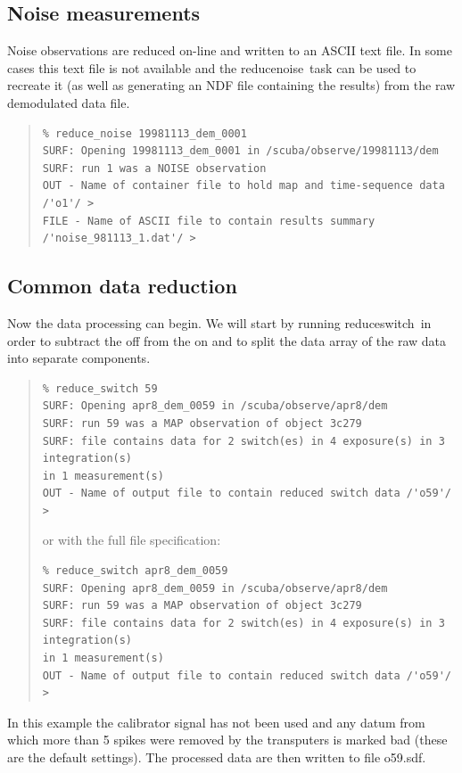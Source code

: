 \documentclass[twoside,11pt]{article}
\newcommand{\task}[1]{{\sf #1}}
\newcommand{\renoise}{\htmlref{\task{reduce\_noise}}{REDUCE_NOISE}}
\newcommand{\resw}{\htmlref{\task{reduce\_switch}}{REDUCE_SWITCH}}
\newenvironment{myquote}{\begin{quote}\begin{small}}{\end{small}\end{quote}}
\newcommand{\htmlref}[2]{#1}
\renewcommand{\_}{\texttt{\symbol{95}}}
\begin{document}
\subsection{Noise measurements}

Noise observations are reduced on-line and written to an ASCII text file.
In some cases this text file is not available and the \renoise\ task
can be used to recreate it (as well as generating an NDF file containing
the results) from the raw demodulated data file.

\begin{myquote}
\begin{verbatim}
% reduce_noise 19981113_dem_0001
SURF: Opening 19981113_dem_0001 in /scuba/observe/19981113/dem
SURF: run 1 was a NOISE observation
OUT - Name of container file to hold map and time-sequence data /'o1'/ > 
FILE - Name of ASCII file to contain results summary /'noise_981113_1.dat'/ > 
\end{verbatim}
\end{myquote}

\subsection{Common data reduction}

Now the data processing can begin. We will start by running 
\resw\ in order to subtract the off from the on and to split the
data array of the raw data into separate components.

\begin{myquote}
\begin{verbatim}
% reduce_switch 59
SURF: Opening apr8_dem_0059 in /scuba/observe/apr8/dem
SURF: run 59 was a MAP observation of object 3c279
SURF: file contains data for 2 switch(es) in 4 exposure(s) in 3 integration(s)
in 1 measurement(s)
OUT - Name of output file to contain reduced switch data /'o59'/ > 
\end{verbatim}
or with the full file specification:
\begin{verbatim}
% reduce_switch apr8_dem_0059
SURF: Opening apr8_dem_0059 in /scuba/observe/apr8/dem
SURF: run 59 was a MAP observation of object 3c279
SURF: file contains data for 2 switch(es) in 4 exposure(s) in 3 integration(s)
in 1 measurement(s)
OUT - Name of output file to contain reduced switch data /'o59'/ > 
\end{verbatim}
\end{myquote}


In this example the calibrator signal has not been used and any datum from
which more than 5 spikes were removed by the transputers is marked bad (these
are the default settings). The processed data are then written to file
o59.sdf.
\end{document}
